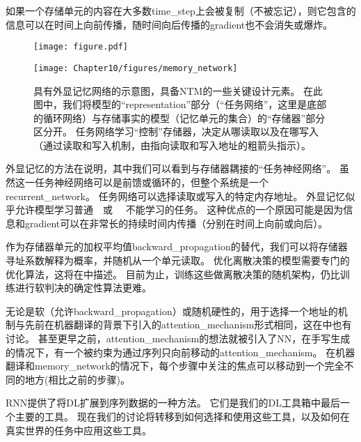 如果一个存储单元的内容在大多数\gls{time_step}上会被复制（不被忘记），则它包含的信息可以在时间上向前传播，随时间向后传播的\gls{gradient}也不会消失或爆炸。

\begin{figure}[!htb]
\ifOpenSource
\centerline{\texttt{[image: figure.pdf]}}
\else
\centerline{\texttt{[image: Chapter10/figures/memory\_network]}}
\fi
\caption{具有外显记忆网络的示意图，具备\gls{NTM}的一些关键设计元素。
在此图中，我们将模型的``\gls{representation}''部分（``任务网络''，这里是底部的循环网络）与存储事实的模型（记忆单元的集合）的``存储器''部分区分开。
任务网络学习``控制''存储器，决定从哪读取以及在哪写入（通过读取和写入机制，由指向读取和写入地址的粗箭头指示）。
}
\label{fig:chap10_memory_network}
\end{figure}

外显记忆的方法在说明，其中我们可以看到与存储器耦接的``任务神经网络''。
虽然这一任务神经网络可以是前馈或循环的，但整个系统是一个\gls{recurrent_network}。
任务网络可以选择读取或写入的特定内存地址。
外显记忆似乎允许模型学习普通~~或~ ~不能学习的任务。
这种优点的一个原因可能是因为信息和\gls{gradient}可以在非常长的持续时间内传播（分别在时间上向前或向后）。


作为存储器单元的加权平均值\gls{backward_propagation}的替代，我们可以将存储器寻址系数解释为概率，并随机从一个单元读取\citep{Zaremba+Sutskever-arxiv2015}。
优化离散决策的模型需要专门的优化算法，这将在中描述。
目前为止，训练这些做离散决策的随机架构，仍比训练进行软判决的确定性算法更难。

无论是软（允许\gls{backward_propagation}）或随机硬性的，用于选择一个地址的机制与先前在机器翻译的背景下引入的\gls{attention_mechanism}形式相同\citep{Bahdanau-et-al-ICLR2015-small}，这在中也有讨论。
甚至更早之前，\gls{attention_mechanism}的想法就被引入了\gls{NN}，在手写生成的情况下\citep{Graves-arxiv2013}，有一个被约束为通过序列只向前移动的\gls{attention_mechanism}。
在机器翻译和\gls{memory_network}的情况下，每个步骤中关注的焦点可以移动到一个完全不同的地方(相比之前的步骤)。

\gls{RNN}提供了将\gls{DL}扩展到序列数据的一种方法。
它们是我们的\gls{DL}工具箱中最后一个主要的工具。
现在我们的讨论将转移到如何选择和使用这些工具，以及如何在真实世界的任务中应用这些工具。
